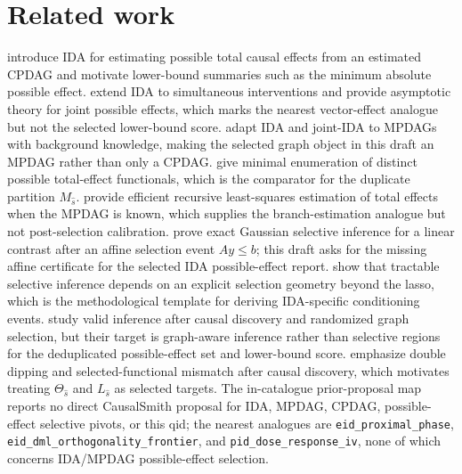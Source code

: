 \documentclass[11pt]{article}
\theoremstyle{definition}
\theoremstyle{plain}
\theoremstyle{remark}
\begin{document}
\section{Related work}
\citet{MaathuisKalischBuhlmann2009IDA} introduce IDA for estimating possible total causal effects from an estimated CPDAG and motivate lower-bound summaries such as the minimum absolute possible effect.
\citet{NandyMaathuisRichardson2017JointIDA} extend IDA to simultaneous interventions and provide asymptotic theory for joint possible effects, which marks the nearest vector-effect analogue but not the selected lower-bound score.
\citet{PerkovicKalischMaathuis2017MPDAG} adapt IDA and joint-IDA to MPDAGs with background knowledge, making the selected graph object in this draft an MPDAG rather than only a CPDAG.
\citet{GuoPerkovic2021MinimalEnumeration} give minimal enumeration of distinct possible total-effect functionals, which is the comparator for the duplicate partition $M_{\widehat s}$.
\citet{GuoPerkovic2022EfficientLS} provide efficient recursive least-squares estimation of total effects when the MPDAG is known, which supplies the branch-estimation analogue but not post-selection calibration.
\citet{LeeSunSunTaylor2016Polyhedral} prove exact Gaussian selective inference for a linear contrast after an affine selection event $Ay\le b$; this draft asks for the missing affine certificate for the selected IDA possible-effect report.
\citet{TibshiraniTaylorLockhartTibshirani2016Sequential} show that tractable selective inference depends on an explicit selection geometry beyond the lasso, which is the methodological template for deriving IDA-specific conditioning events.
\citet{GraduZrnicWangJordan2025ValidInference} study valid inference after causal discovery and randomized graph selection, but their target is graph-aware inference rather than selective regions for the deduplicated possible-effect set and lower-bound score.
\citet{ChangGuoMalinsky2026PostSelectionCausalDiscovery} emphasize double dipping and selected-functional mismatch after causal discovery, which motivates treating $\Theta_{\widehat s}$ and $L_{\widehat s}$ as selected targets.
The in-catalogue prior-proposal map reports no direct CausalSmith proposal for IDA, MPDAG, CPDAG, possible-effect selective pivots, or this qid; the nearest analogues are \texttt{eid\_proximal\_phase}, \texttt{eid\_dml\_orthogonality\_frontier}, and \texttt{pid\_dose\_response\_iv}, none of which concerns IDA/MPDAG possible-effect selection.
\end{document}

